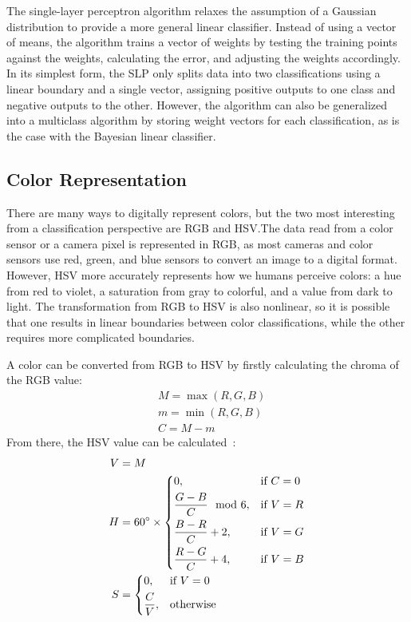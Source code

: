 \documentclass[twoside]{IEEEtran}
\begin{document}
The single-layer perceptron algorithm relaxes the assumption of a Gaussian distribution to
provide a more general linear classifier. Instead of using a vector of means, the algorithm trains a
vector of weights by testing the training points against the weights, calculating the error, and
adjusting the weights accordingly. In its simplest form, the SLP only splits data into two
classifications using a linear boundary and a single vector, assigning positive outputs to one class
and negative outputs to the other. However, the algorithm can also be generalized into a multiclass
algorithm by storing weight vectors for each classification, as is the case with the Bayesian linear
classifier.

\subsection{Color Representation}

There are many ways to digitally represent colors, but the two most interesting from a
classification perspective are RGB and HSV.\@ The data read from a color sensor or a camera pixel
is represented in RGB, as most cameras and color sensors use red, green, and blue sensors to
convert an image to a digital format. However, HSV more accurately represents how we humans
perceive colors: a hue from red to violet, a saturation from gray to colorful, and a value from
dark to light. The transformation from RGB to HSV is also nonlinear, so it is possible that one
results in linear boundaries between color classifications, while the other requires more
complicated boundaries.

A color can be converted from RGB to HSV by firstly calculating the chroma of the RGB value:
\begin{align}
     & M = \max\left(R, G, B\right) \\
     & m = \min\left(R, G, B\right) \\
     & C = M - m
\end{align}
From there, the HSV value can be calculated~\cite{hsv}:
\begin{align}
    V & = M                                                          \\
    H & = 60^\circ \times \begin{dcases}
                              0,                      & \text{if } C = 0 \\
                              \frac{G - B}{C} \mod 6, & \text{if } V = R \\
                              \frac{B - R}{C} + 2,    & \text{if } V = G \\
                              \frac{R - G}{C} + 4,    & \text{if } V = B
                          \end{dcases} \\
    S & = \begin{dcases}
              0,           & \text{if } V = 0 \\
              \frac{C}{V}, & \text{otherwise}
          \end{dcases}
\end{align}
\end{document}
